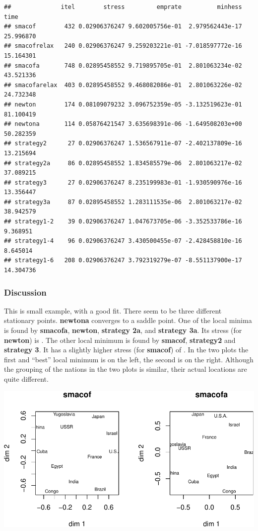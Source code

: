 \documentclass[
  12pt,
]{article}
\begin{document}
\begin{verbatim}
##              itel        stress         emprate          minhess      time
## smacof        432 0.02906376247 9.602005756e-01  2.979562443e-17 25.996870
## smacofrelax   240 0.02906376247 9.259203221e-01 -7.018597772e-16 15.164301
## smacofa       748 0.02895458552 9.719895705e-01  2.801063234e-02 43.521336
## smacofarelax  403 0.02895458552 9.468082086e-01  2.801063226e-02 24.732348
## newton        174 0.08109079232 3.096752359e-05 -3.132519623e-01 81.100419
## newtona       114 0.05876421547 3.635698391e-06 -1.649508203e+00 50.282359
## strategy2      27 0.02906376247 1.536567911e-07 -2.402137809e-16 13.215694
## strategy2a     86 0.02895458552 1.834585579e-06  2.801063217e-02 37.089215
## strategy3      27 0.02906376247 8.235199983e-01 -1.930590976e-16 13.356447
## strategy3a     87 0.02895458552 1.283111535e-06  2.801063217e-02 38.942579
## strategy1-2    39 0.02906376247 1.047673705e-06 -3.352533786e-16  9.368951
## strategy1-4    96 0.02906376247 3.430500455e-07 -2.428458810e-16  8.645014
## strategy1-6   208 0.02906376247 3.792319279e-07 -8.551137900e-17 14.304736
\end{verbatim}

\subsubsection{Discussion}\label{discussion-6}

This is small example, with a good fit. There seem to be three different stationary points.
\textbf{newtona} converges to a saddle point. One of the local minima is found by
\textbf{smacofa}, \textbf{newton}, \textbf{strategy 2a}, and \textbf{strategy 3a}. Its stress (for \textbf{newton}) is . The other local minimum is found by
\textbf{smacof}, \textbf{strategy2} and \textbf{strategy 3}. It has a slightly higher stress (for \textbf{smacof}) of . In the two plots the first and ``best'' local minimum is on the
left, the second is on the right. Although the grouping of the nations in the two plots
is similar, their actual locations are quite different.

\includegraphics{sNewton_files/figure-latex/wishplot-1.pdf}
\end{document}
